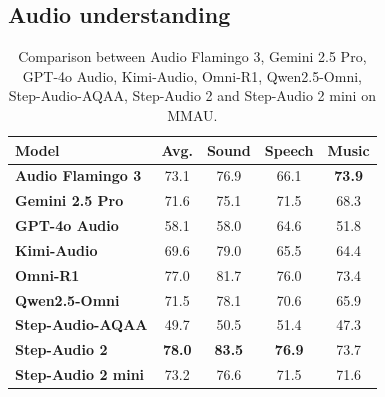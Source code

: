 \subsection{Audio understanding}
\begin{table}[h]
\caption{Comparison between Audio Flamingo 3, Gemini 2.5 Pro, GPT-4o Audio, Kimi-Audio, Omni-R1, Qwen2.5-Omni, Step-Audio-AQAA, Step-Audio 2 and Step-Audio 2 mini on MMAU.}
\label{tab:MMAU-7b}
\centering
\begin{tabular}{lcccc}
\toprule
\textbf{Model}& \textbf{Avg.} & \textbf{Sound} & \textbf{Speech} & \textbf{Music}  \\
\midrule
\textbf{Audio Flamingo 3} &73.1 & 76.9& 66.1& \textbf{73.9}\\
\textbf{Gemini 2.5 Pro} & 71.6  & 75.1& 71.5 &68.3\\
\textbf{GPT-4o Audio} & 58.1 & 58.0& 64.6 &51.8\\
\textbf{Kimi-Audio} & 69.6& 79.0& 65.5&64.4\\
\textbf{Omni-R1}&77.0 & 81.7& 76.0&73.4\\
\textbf{Qwen2.5-Omni} &71.5 & 78.1& 70.6&65.9\\
\textbf{Step-Audio-AQAA} & 49.7 &  50.5&  51.4& 47.3\\
\textbf{Step-Audio 2} & \textbf{78.0} & \textbf{83.5} & \textbf{76.9} & 73.7\\
\textbf{Step-Audio 2 mini} & 73.2 & 76.6 & 71.5 & 71.6\\
\bottomrule
\end{tabular}
\end{table}
\newpage

